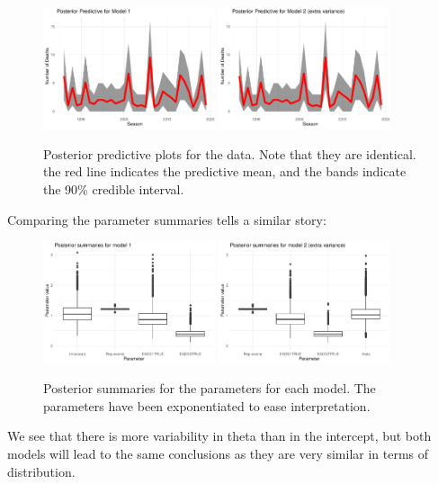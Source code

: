 \documentclass[12pt]{extarticle}
\begin{document}
\begin{figure}[H]
	\includegraphics[width = 0.45\textwidth]{../ppmod1}
	\includegraphics[width = 0.45\textwidth]{../ppmod2}
	\caption{Posterior predictive plots for the data. Note that they are identical. the red line indicates the predictive mean, and the bands indicate the 90\% credible interval.}
	\label{fig:postpreddata}
\end{figure}

Comparing the parameter summaries tells a similar story: 

\begin{figure}[H]
	\includegraphics[width = 0.45\textwidth]{../psmod1}
	\includegraphics[width = 0.45\textwidth]{../psmod2}
	\caption{Posterior summaries for the parameters for each model. The parameters have been exponentiated to ease interpretation.}
	\label{fig:postsummods}
\end{figure}
We see that there is more variability in theta than in the intercept, but both models will lead to the same conclusions as they are very similar in terms of distribution. 
\end{document}
